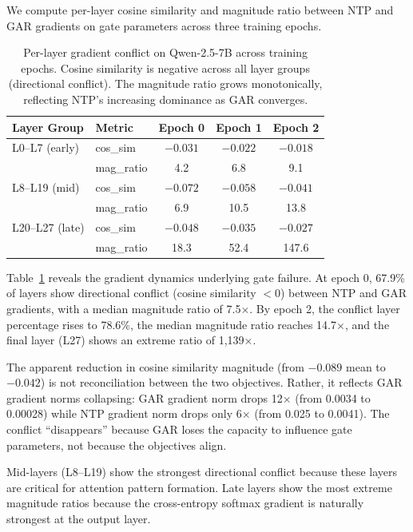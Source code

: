 \documentclass[11pt,a4paper]{article}
\begin{document}
We compute per-layer cosine similarity and magnitude ratio between NTP and GAR gradients on gate parameters across three training epochs.

\begin{table}[t]
\centering
\caption{Per-layer gradient conflict on Qwen-2.5-7B across training epochs. Cosine similarity is negative across all layer groups (directional conflict). The magnitude ratio grows monotonically, reflecting NTP's increasing dominance as GAR converges.}
\label{tab:grad_conflict}
\begin{tabular}{llccc}
\toprule
\textbf{Layer Group} & \textbf{Metric} & \textbf{Epoch 0} & \textbf{Epoch 1} & \textbf{Epoch 2} \\
\midrule
L0--L7 (early)   & cos\_sim    & $-0.031$ & $-0.022$ & $-0.018$ \\
                  & mag\_ratio  & 4.2      & 6.8      & 9.1 \\
L8--L19 (mid)    & cos\_sim    & $-0.072$ & $-0.058$ & $-0.041$ \\
                  & mag\_ratio  & 6.9      & 10.5     & 13.8 \\
L20--L27 (late)  & cos\_sim    & $-0.048$ & $-0.035$ & $-0.027$ \\
                  & mag\_ratio  & 18.3     & 52.4     & 147.6 \\
\bottomrule
\end{tabular}
\end{table}

Table~\ref{tab:grad_conflict} reveals the gradient dynamics underlying gate failure.
At epoch 0, 67.9\% of layers show directional conflict (cosine similarity $< 0$) between NTP and GAR gradients, with a median magnitude ratio of 7.5$\times$.
By epoch 2, the conflict layer percentage rises to 78.6\%, the median magnitude ratio reaches 14.7$\times$, and the final layer (L27) shows an extreme ratio of 1,139$\times$.

The apparent reduction in cosine similarity magnitude (from $-0.089$ mean to $-0.042$) is not reconciliation between the two objectives. Rather, it reflects GAR gradient norms collapsing: GAR gradient norm drops 12$\times$ (from 0.0034 to 0.00028) while NTP gradient norm drops only 6$\times$ (from 0.025 to 0.0041).
The conflict ``disappears'' because GAR loses the capacity to influence gate parameters, not because the objectives align.

Mid-layers (L8--L19) show the strongest directional conflict because these layers are critical for attention pattern formation. Late layers show the most extreme magnitude ratios because the cross-entropy softmax gradient is naturally strongest at the output layer.
\end{document}

